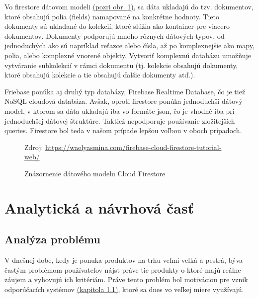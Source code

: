 Vo firestore dátovom modeli \hyperref[firestore]{(pozri obr. \ref{firestore})}, sa dáta ukladajú do tzv. dokumentov, ktoré obsahujú polia (fields) namapované na konkrétne hodnoty. Tieto dokumenty sú ukladané do kolekcií, ktoré slúžia ako kontainer pre viacero dokumentov. Dokumenty podporujú mnoho rôznych dátových typov, od jednoduchých ako sú napríklad reťazce alebo čísla, až po komplexnejšie ako mapy, polia, alebo komplexné vnorené objekty. Vytvoriť komplexnú databázu umožňuje vytváranie subkolekcií v rámci dokumentu (tj. kolekcie obsahujú dokumenty, ktoré obsahujú kolekcie a tie obsahujú ďalšie dokumenty atď.). \cite{firestoredoc}

Friebase ponúka aj druhý typ databázy, Firebase Realtime Database, čo je tiež NoSQL cloudová databáza. Avšak, oproti firestore ponúka jednoduchší dátový model, v ktorom sa dáta ukladajú iba vo formáte \acrshort{json}, čo je vhodné iba pri jednoduchšej dátovej štruktúre. Taktiež nepodporuje používanie zložitejších queries. Firestore bol teda v našom prípade lepšou voľbou v oboch prípadoch. \\

\begin{figure}[!htbp]
  \centering  
  \def\stackalignment{c}
           {\scriptsize%
            Zdroj: \url{https://waelyasmina.com/firebase-cloud-firestore-tutorial-web/}}
	\caption{Znázornenie dátového modelu Cloud Firestore} 
  \label{firestore}
\end{figure}


\section{Analytická a návrhová časť}
\subsection{Analýza problému}
V dnešnej dobe, kedy je ponuka produktov na trhu veľmi veľká a pestrá, býva častým problémom používateľov nájsť práve tie produkty o ktoré majú reálne záujem a vyhovujú ich kritériám. Práve tento problém bol motiváciou pre vznik odporúčacích systémov \hyperref[sec:odporucacie systemy]{(kapitola 1.1)}, ktoré sa dnes vo veľkej miere využívajú. 

